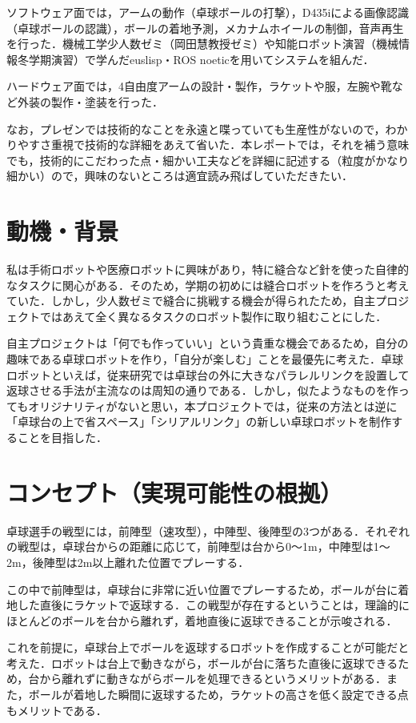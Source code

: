 \documentclass[10pt, oneside, titlepage]{ltjarticle}  %
\begin{document}
ソフトウェア面では，アームの動作（卓球ボールの打撃），D435iによる画像認識（卓球ボールの認識），ボールの着地予測，メカナムホイールの制御，音声再生を行った．機械工学少人数ゼミ（岡田慧教授ゼミ）や知能ロボット演習（機械情報冬学期演習）で学んだeuslisp・ROS noeticを用いてシステムを組んだ．

ハードウェア面では，4自由度アームの設計・製作，ラケットや服，左腕や靴など外装の製作・塗装を行った．

なお，プレゼンでは技術的なことを永遠と喋っていても生産性がないので，わかりやすさ重視で技術的な詳細をあえて省いた．本レポートでは，それを補う意味でも，技術的にこだわった点・細かい工夫などを詳細に記述する（粒度がかなり細かい）ので，興味のないところは適宜読み飛ばしていただきたい．

\section{動機・背景}
私は手術ロボットや医療ロボットに興味があり，特に縫合など針を使った自律的なタスクに関心がある．そのため，学期の初めには縫合ロボットを作ろうと考えていた．しかし，少人数ゼミで縫合に挑戦する機会が得られたため，自主プロジェクトではあえて全く異なるタスクのロボット製作に取り組むことにした．

自主プロジェクトは「何でも作っていい」という貴重な機会であるため，自分の趣味である卓球ロボットを作り，「自分が楽しむ」ことを最優先に考えた．卓球ロボットといえば，従来研究では卓球台の外に大きなパラレルリンクを設置して返球させる手法が主流なのは周知の通りである．しかし，似たようなものを作ってもオリジナリティがないと思い，本プロジェクトでは，従来の方法とは逆に「卓球台の上で省スペース」「シリアルリンク」の新しい卓球ロボットを制作することを目指した．

\section{コンセプト（実現可能性の根拠）}
卓球選手の戦型には，前陣型（速攻型），中陣型、後陣型の3つがある．それぞれの戦型は，卓球台からの距離に応じて，前陣型は台から0〜1m，中陣型は1〜2m，後陣型は2m以上離れた位置でプレーする．

この中で前陣型は，卓球台に非常に近い位置でプレーするため，ボールが台に着地した直後にラケットで返球する．この戦型が存在するということは，理論的にほとんどのボールを台から離れず，着地直後に返球できることが示唆される．

これを前提に，卓球台上でボールを返球するロボットを作成することが可能だと考えた．ロボットは台上で動きながら，ボールが台に落ちた直後に返球できるため，台から離れずに動きながらボールを処理できるというメリットがある．また，ボールが着地した瞬間に返球するため，ラケットの高さを低く設定できる点もメリットである．
\end{document}
